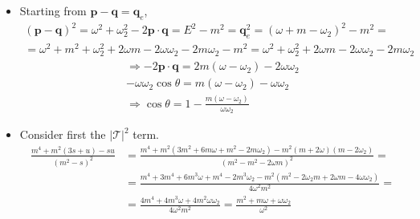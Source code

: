 \documentclass[twoside]{amsart}
\begin{document}
\begin{itemize}
Recall that 
\[
\begin{aligned}
  & s = - (k_1 + k_2)^2 \\ 
  & t = - (k_1 - k_1')^2 \\ 
  & u = - (k_1 - k_2')^2 
\end{aligned}
\]
then for our case
\[
\begin{aligned}
  & s = ( \omega + m)^2 - \mathbf{p}^2 = 2 \omega m + m^2 = m ( m + 2 \omega )  \\
  & t = - ((\omega - \omega_2, \mathbf{p} - \mathbf{q}))^2 = \omega^2 - 2 \omega \omega_2 + \omega_2^2 - ( \mathbf{p}^2 - 2 \mathbf{p} \cdot \mathbf{q} + \mathbf{q}^2 ) = -2 \omega \omega_2 ( 1 - \cos{\theta}) \\ 
  & u = - ( ( \omega - E, \mathbf{p} - \mathbf{q}_e ) )^2 = ( \omega_2 - m)^2 - \omega_2^2 = m (m - 2 \omega_2)
\end{aligned}
\]
\item[(b)] Starting from $\mathbf{p} - \mathbf{q} = \mathbf{q}_e$, 
\[
\begin{gathered}
  (\mathbf{p} - \mathbf{q})^2 = \omega^2 + \omega_2^2 - 2 \mathbf{p} \cdot \mathbf{q} = E^2 - m^2 = \mathbf{q}_e^2 = ( \omega + m - \omega_2)^2 - m^2 = \\ 
  = \omega^2 + m^2 + \omega_2^2 + 2\omega m - 2 \omega \omega_2 - 2 m \omega_2 - m^2 = \omega^2 + \omega_2^2 + 2 \omega m - 2 \omega \omega_2 - 2 m \omega_2
\end{gathered}
\]
\[
\begin{gathered}
  \Longrightarrow -2 \mathbf{p} \cdot \mathbf{q} = 2 m ( \omega - \omega_2) - 2 \omega \omega_2 \\ 
   -\omega \omega_2 \cos{\theta} = m ( \omega - \omega_2) - \omega \omega_2 \\ 
   \Longrightarrow \cos{\theta} = 1 - \frac{ m ( \omega - \omega_2) }{ \omega \omega_2 }
\end{gathered}
\]
\item[(c)] Consider first the $|\mathcal{T}|^2$ term.  
\[
\begin{aligned}
  \frac{ m^4 + m^2 ( 3s + u ) - su }{ (m^2 - s)^2 } & = \frac{ m^4 + m^2 ( 3m^2 + 6 m \omega + m^2 - 2 m \omega_2 ) - m^2 ( m+ 2\omega) ( m-2\omega_2)  }{ (m^2 - m^2 - 2 \omega m )^2 } = \\
  & = \frac{ m^4 + 3m^4 + 6 m^3 \omega + m^4 - 2 m^3 \omega_2 - m^2 ( m^2 - 2 \omega_2 m + 2 \omega m - 4 \omega \omega_2 ) }{ 4 \omega^2 m^2 }  = \\ 
  & = \frac{ 4 m^4 + 4 m^3 \omega + 4 m^2 \omega \omega_2 }{ 4 \omega^2 m^2 } = \frac{ m^2 + m\omega + \omega \omega_2 }{ \omega^2 } 
\end{aligned}
\]


\end{itemize}
\end{document}
